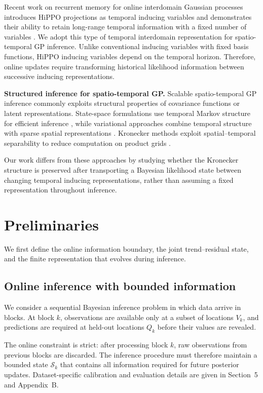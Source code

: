 \documentclass[twoside]{article}
\begin{document}
Recent work on recurrent memory for online interdomain Gaussian
processes introduces HiPPO projections as temporal inducing variables
and demonstrates their ability to retain long-range temporal
information with a fixed number of variables
\citep{Chen2025}. We adopt this type of temporal interdomain
representation for spatio-temporal GP inference. Unlike conventional
inducing variables with fixed basis functions, HiPPO inducing variables
depend on the temporal horizon. Therefore, online updates require
transforming historical likelihood information between successive
inducing representations.


\textbf{Structured inference for spatio-temporal GP.}
Scalable spatio-temporal GP inference commonly exploits structural
properties of covariance functions or latent representations.
State-space formulations use temporal Markov structure for efficient
inference \citep{Hartikainen2010,Nickisch2018}, while variational
approaches combine temporal structure with sparse spatial
representations \citep{Adam2020,Hamelijnck2021}. Kronecker methods
exploit spatial--temporal separability to reduce computation on product
grids \citep{VanLoan2000,Flaxman2015}.

Our work differs from these approaches by studying whether the
Kronecker structure is preserved after transporting a Bayesian
likelihood state between changing temporal inducing representations,
rather than assuming a fixed representation throughout inference.

\section{Preliminaries}

We first define the online information boundary, the joint trend--residual state, and the finite representation that evolves during inference.

\subsection{Online inference with bounded information}

We consider a sequential Bayesian inference problem in which data arrive in blocks. At block $k$, observations are available only at a subset of locations $V_k$, and predictions are required at held-out locations $Q_k$ before their values are revealed.

The online constraint is strict: after processing block $k$, raw observations from previous blocks are discarded. The inference procedure must therefore maintain a bounded state $\mathcal S_k$ that contains all information required for future posterior updates. Dataset-specific calibration and evaluation details are given in Section~5 and Appendix~B.
\end{document}
